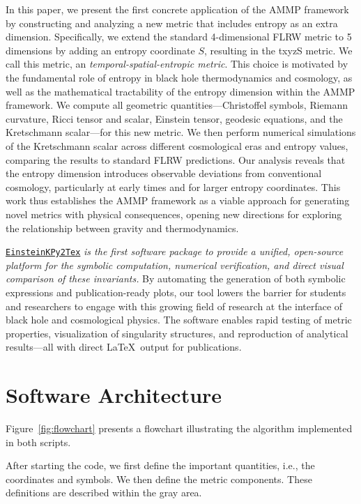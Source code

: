 \documentclass[11pt,a4paper]{article}
\begin{document}
In this paper, we present the first concrete application of the AMMP framework 
by constructing and analyzing a new metric that includes entropy as an extra 
dimension. Specifically, we extend the standard 4-dimensional FLRW metric 
to 5 dimensions by adding an entropy coordinate $S$, resulting in the 
txyzS metric. We call this metric, an \textit{temporal-spatial-entropic metric}. This choice is motivated by the fundamental role of entropy 
in black hole thermodynamics and cosmology, as well as the mathematical 
tractability of the entropy dimension within the AMMP framework. We compute 
all geometric quantities—Christoffel symbols, Riemann curvature, Ricci 
tensor and scalar, Einstein tensor, geodesic equations, and the Kretschmann 
scalar—for this new metric. We then perform numerical simulations of the 
Kretschmann scalar across different cosmological eras and entropy values, 
comparing the results to standard FLRW predictions. Our analysis reveals 
that the entropy dimension introduces observable deviations from 
conventional cosmology, particularly at early times and for larger entropy 
coordinates. This work thus establishes the AMMP framework as a viable 
approach for generating novel metrics with physical consequences, opening 
new directions for exploring the relationship between gravity and 
thermodynamics.

\href{https://github.com/lontelis/Einsteinpy_to_latex}{{\color{cyan}\texttt{EinsteinKPy2Tex}}} \textit{is the first software package to provide a unified, 
open-source platform for the symbolic computation, numerical verification, 
and direct visual comparison of these invariants.} By automating the 
generation of both symbolic expressions and publication-ready plots, our 
tool lowers the barrier for students and researchers to engage with this 
growing field of research at the interface of black hole and cosmological 
physics. The software enables rapid testing of metric properties, 
visualization of singularity structures, and reproduction of analytical 
results---all with direct \LaTeX\ output for publications.

\section{Software Architecture}

Figure~\ref{fig:flowchart} presents a flowchart illustrating the algorithm implemented in both scripts. 

After starting the code, we first define the important quantities, i.e., the coordinates and symbols. 
We then define the metric components. These definitions are described within the gray area. 
\end{document}
